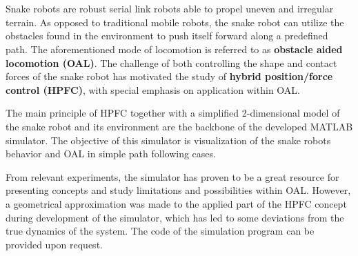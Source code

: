 \chapter{\abstractname}




Snake robots are robust serial link robots able to propel uneven and irregular terrain. As opposed to traditional mobile robots, the snake robot can utilize the obstacles found in the environment to push itself forward along a predefined path. The aforementioned mode of locomotion is referred to as \textbf{obstacle aided locomotion (OAL)}. The challenge of both controlling the shape and contact forces of the snake robot has motivated the study of \textbf{hybrid position/force control (HPFC)}, with special emphasis on application within OAL.




The main principle of HPFC together with a simplified 2-dimensional model of the snake robot and its environment are the backbone of the developed MATLAB simulator. The objective of this simulator is visualization of the snake robots behavior and OAL in simple path following cases.


From relevant experiments, the simulator has proven to be a great resource for presenting concepts and study limitations and possibilities within OAL. However, a geometrical approximation was made to the applied part of the HPFC concept during development of the simulator, which has led to some deviations from the true dynamics of the system. The code of the simulation program can be provided upon request.


\makeatletter
{}


\makeatother







